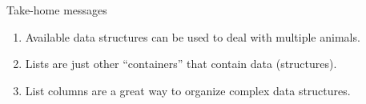 \documentclass[ignorenonframetext,,t]{beamer}
\providecommand{\tightlist}{%
\setlength{\itemsep}{0pt}\setlength{\parskip}{0pt}}
\providecommand{\tightlist}{%
\setlength{\itemsep}{0pt}\setlength{\parskip}{0pt}}
\renewcommand{\tightlist}{\setlength{\itemsep}{1.4ex}\setlength{\parskip}{0pt}}
\begin{document}
\begin{frame}{Take-home messages}
\protect\hypertarget{take-home-messages}{}
\begin{enumerate}
\tightlist
\item
  Available data structures can be used to deal with multiple animals.
\item
  Lists are just other ``containers'' that contain data (structures).
\item
  List columns are a great way to organize complex data structures.
\end{enumerate}
\end{frame}
\end{document}
